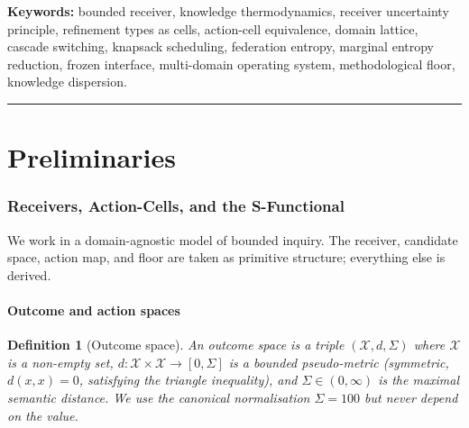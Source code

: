 \documentclass[11pt,a4paper]{article}
\newtheorem{definition}[theorem]{Definition}
\newcommand{\Cands}{\mathcal{X}}
\newcommand{\Sigmax}{\Sigma}
\begin{document}
\begin{abstract}
complexity bound, every theorem is verified by a numerical experiment whose results are persisted as JSON. The framework is independent of any prior work and self-contained in standard real analysis, lattice theory, information theory, and convex optimisation.
\end{abstract}

\noindent\textbf{Keywords:} bounded receiver, knowledge thermodynamics, receiver uncertainty principle, refinement types as cells, action-cell equivalence, domain lattice, cascade switching, knapsack scheduling, federation entropy, marginal entropy reduction, frozen interface, multi-domain operating system, methodological floor, knowledge dispersion.

\tableofcontents

\vspace{6pt}
\hrule
\vspace{6pt}

\part{Preliminaries}

\section{Receivers, Action-Cells, and the S-Functional}
\label{sec:preliminaries}

We work in a domain-agnostic model of bounded inquiry. The receiver, candidate space, action map, and floor are taken as primitive structure; everything else is derived.

\subsection{Outcome and action spaces}

\begin{definition}[Outcome space]
\label{def:outcome}
An \emph{outcome space} is a triple $(\Cands, d, \Sigmax)$ where $\Cands$ is a non-empty set, $d : \Cands \times \Cands \to [0, \Sigmax]$ is a bounded pseudo-metric (symmetric, $d(x,x)=0$, satisfying the triangle inequality), and $\Sigmax \in (0, \infty)$ is the maximal semantic distance. We use the canonical normalisation $\Sigmax = 100$ but never depend on the value.
\end{definition}
\end{document}
